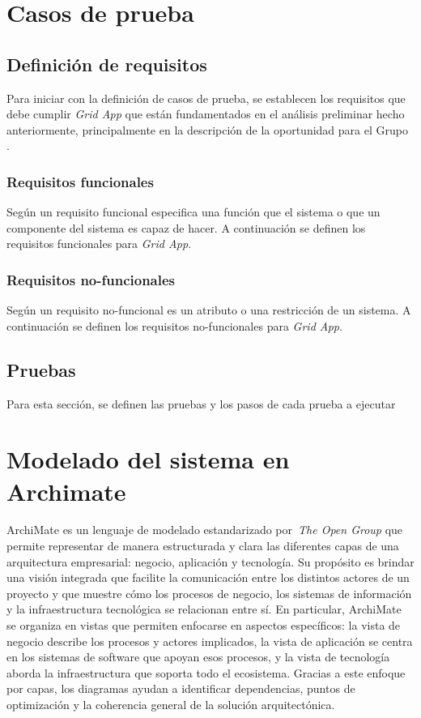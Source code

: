 \section{Casos de prueba}

\subsection{Definición de requisitos}
\noindent
Para iniciar con la definición de casos de prueba, se establecen los requisitos que debe cumplir \textit{Grid App} que están fundamentados en el análisis preliminar hecho anteriormente, principalmente en la descripción de la oportunidad para el Grupo \GRID.

\subsubsection{Requisitos funcionales}
\noindent
Según \cite{159342} un requisito funcional especifica una función que el sistema o que un componente del sistema es capaz de hacer. A continuación se definen los requisitos funcionales para \textit{Grid App}.


\subsubsection{Requisitos no-funcionales}
\noindent
Según \cite{4384163} un requisito no-funcional es un atributo o una restricción de un sistema. A continuación se definen los requisitos no-funcionales para \textit{Grid App}.


\subsection{Pruebas}
\noindent
Para esta sección, se definen las pruebas y los pasos de cada prueba a ejecutar

\section{Modelado del sistema en Archimate}
ArchiMate es un lenguaje de modelado estandarizado por~\textit{The Open Group} que permite representar de manera estructurada y clara las diferentes capas de una arquitectura empresarial: negocio, aplicación y tecnología. Su propósito es brindar una visión integrada que facilite la comunicación entre los distintos actores de un proyecto y que muestre cómo los procesos de negocio, los sistemas de información y la infraestructura tecnológica se relacionan entre sí.
En particular, ArchiMate se organiza en vistas que permiten enfocarse en aspectos específicos: la vista de negocio describe los procesos y actores implicados, la vista de aplicación se centra en los sistemas de software que apoyan esos procesos, y la vista de tecnología aborda la infraestructura que soporta todo el ecosistema. Gracias a este enfoque por capas, los diagramas ayudan a identificar dependencias, puntos de optimización y la coherencia general de la solución arquitectónica.

